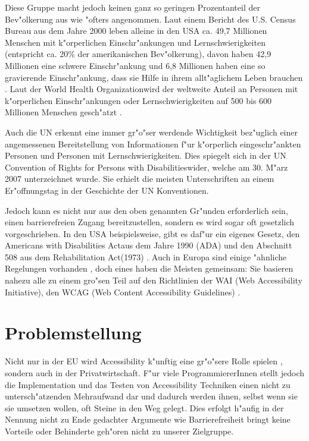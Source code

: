 \documentclass[a4paper,bibtotoc,oneside]{scrbook}
\begin{document}
Diese Gruppe macht jedoch keinen ganz so geringen Prozentanteil der Bev"olkerung aus wie "ofters angenommen. Laut einem Bericht des U.S. Census Bureau aus dem Jahre 2000 leben alleine in den USA ca. 49,7 Millionen Menschen mit k"orperlichen Einschr"ankungen und Lernschwierigkeiten (entspricht ca. 20\% der amerikanischen Bev"olkerung), davon haben 42,9 Millionen eine schwere Einschr"ankung und 6,8 Millionen haben eine so gravierende Einschr"ankung, dass sie Hilfe in ihrem allt"aglichem Leben brauchen \cite[S. 1]{us_cens}. Laut der \glqq World Health Organization\grqq wird der weltweite Anteil an Personen mit k"orperlichen Einschr"ankungen oder Lernschwierigkeiten auf 500 bis 600 Millionen Menschen gesch"atzt \cite{who_dis}.

Auch die UN erkennt eine immer gr"o"ser werdende Wichtigkeit bez"uglich einer angemessenen Bereitstellung von Informationen f"ur k"orperlich eingeschr"ankten Personen und Personen mit Lernschwierigkeiten. Dies spiegelt sich in der \glqq UN Convention of Rights for Persons with Disabilities\grqq wider, welche am 30. M"arz 2007 unterzeichnet wurde. Sie erhielt die \glqq meisten Unterschriften an einem Er"offnungstag in der Geschichte der UN Konventionen\grqq \cite{un_disabilities}. 

Jedoch kann es nicht nur aus den oben genannten Gr"unden erforderlich sein,
einen barrierefreien Zugang bereitzustellen, sondern es wird sogar oft gesetzlich vorgeschrieben. In den USA beispielsweise, gibt es daf"ur ein eigenes Gesetz, den \glqq Americans with Disabilities Act\grqq aus dem Jahre 1990 (ADA) und den Abschnitt 508 aus dem \glqq Rehabilitation Act\grqq (1973) \cite[S. 288-289]{achieving_web_acc}. Auch in Europa sind einige "ahnliche Regelungen vorhanden \cite[S. 7]{mod_software}, doch eines haben die Meisten gemeinsam: Sie basieren nahezu alle zu einem gro"sen Teil auf den Richtlinien der WAI (Web Accessibility Initiative), den WCAG (Web Content Accessibility Guidelines) \cite[S. 289]{achieving_web_acc} \cite[S. 7]{mod_software}.

\section{Problemstellung}
Nicht nur in der EU wird Accessibility k"unftig eine gr"o"sere Rolle spielen \cite[Abschnitt EU]{w3c_pol}, sondern auch in der Privatwirtschaft. F"ur viele ProgrammiererInnen stellt jedoch die Implementation und das Testen von Accessibility Techniken einen nicht zu untersch"atzenden Mehraufwand dar \cite[S. 27]{understand_acc} und dadurch werden ihnen, selbst wenn sie sie umsetzen wollen, oft Steine in den Weg gelegt. Dies erfolgt h"aufig in der Nennung nicht zu Ende gedachter Argumente wie \glqq Barrierefreiheit bringt keine Vorteile\grqq \cite[S. 28]{understand_acc} oder \glqq Behinderte geh"oren nicht zu unserer Zielgruppe\grqq \cite[S. 31]{understand_acc}.
\end{document}
